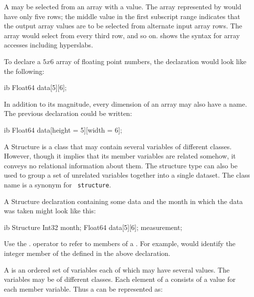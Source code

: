 \begin{description}
  A   may be selected from an
  array with a  value. The array
  represented by  would have only five rows;
  the middle value in the first subscript range indicates that the
  output array values are to be selected from alternate input array
  rows. The array  would select from every
  third row, and so on.  shows the syntax
  for array accesses including hyperslabs.
  
  To declare a $5x6$ array of floating point numbers, the declaration
  would look like the following:

\begin{vcode}{ib}
Float64 data[5][6];
\end{vcode}

In addition to its magnitude, every dimension of an array may also
have a name.  The previous declaration could be written:

\begin{vcode}{ib}
Float64 data[height = 5][width = 6];
\end{vcode}

\item [\class{Structure}] A Structure is a class that may contain
  several variables of different classes. However, though it implies
  that its member variables are related somehow, it conveys no
  relational information about them. The structure type can also be
  used to group a set of unrelated variables together into a single
  dataset. The {\tt{}} class name is a synonym for {\tt
    structure}.  
  
  A Structure declaration containing some data and the month in which
  the data was taken might look like this:

\begin{vcode}{ib}
   Structure {
      Int32 month;
      Float64 data[5][6];
   } measurement;
\end{vcode}

Use the $.$ operator to refer to members of a .  For
example,  would identify the integer member of
the  defined in the above declaration.

\item [\class{Sequence}] A  is an ordered set of
  variables each of which may have several values. The variables may
  be of different classes. Each element of a  consists
  of a value for each member variable. Thus a  can be
  represented as:  


\end{description}
